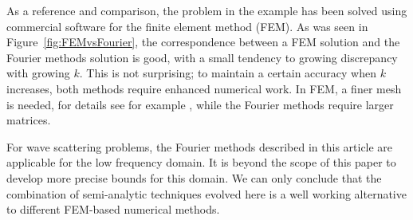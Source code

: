 \documentclass[numreferences]{kluwer}
\begin{document}
As a reference and comparison, the problem in the example has been
solved using commercial software for the finite element method
(FEM). As was seen in Figure~\ref{fig:FEMvsFourier}, the
correspondence between a FEM solution and the Fourier methods solution
is good, with a small tendency to growing discrepancy with growing
$k$. This is not surprising; to maintain a certain accuracy when $k$
increases, both methods require enhanced numerical work. In FEM, a
finer mesh is needed, for details see for example
\cite{Ihlenburg:1998}, while the Fourier methods require larger
matrices.

For wave scattering problems, the Fourier methods described in this
article are applicable for the low frequency domain.
It is beyond the scope of this paper to develop more precise bounds
for this domain. We can only conclude that the combination of
semi-analytic techniques evolved here is a well working
alternative to different FEM-based numerical methods.

 

\end{document}
